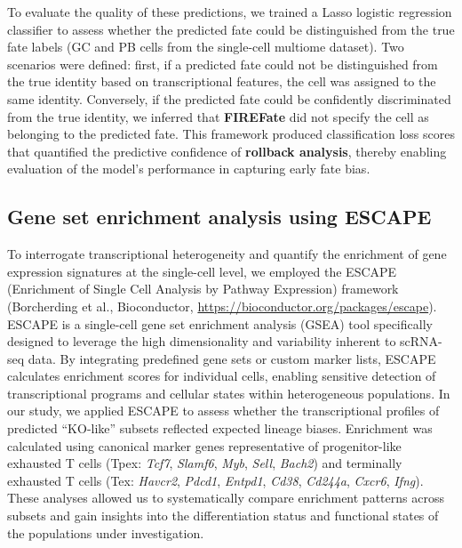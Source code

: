 \documentclass[11pt]{article}
\begin{document}
To evaluate the quality of these predictions, we trained a Lasso logistic regression
classifier to assess whether the predicted fate could be distinguished from the true fate
labels (GC and PB cells from the single-cell multiome dataset). Two scenarios were
defined: first, if a predicted fate could not be distinguished from the true identity
based on transcriptional features, the cell was assigned to the same identity.
Conversely, if the predicted fate could be confidently discriminated from the true
identity, we inferred that \textbf{FIREFate} did not specify the cell as belonging to the
predicted fate. This framework produced classification loss scores that quantified the
predictive confidence of \textbf{rollback analysis}, thereby enabling evaluation of the
model's performance in capturing early fate bias.

\subsection*{Gene set enrichment analysis using ESCAPE}

To interrogate transcriptional heterogeneity and quantify the enrichment of gene
expression signatures at the single-cell level, we employed the ESCAPE (Enrichment of
Single Cell Analysis by Pathway Expression) framework (Borcherding et al., Bioconductor,
\url{https://bioconductor.org/packages/escape}). ESCAPE is a single-cell gene set
enrichment analysis (GSEA) tool specifically designed to leverage the high dimensionality
and variability inherent to scRNA-seq data. By integrating predefined gene sets or custom
marker lists, ESCAPE calculates enrichment scores for individual cells, enabling
sensitive detection of transcriptional programs and cellular states within heterogeneous
populations. In our study, we applied ESCAPE to assess whether the transcriptional
profiles of predicted ``KO-like'' subsets reflected expected lineage biases. Enrichment
was calculated using canonical marker genes representative of progenitor-like exhausted
T cells (Tpex: \textit{Tcf7}, \textit{Slamf6}, \textit{Myb}, \textit{Sell},
\textit{Bach2}) and terminally exhausted T cells (Tex: \textit{Havcr2}, \textit{Pdcd1},
\textit{Entpd1}, \textit{Cd38}, \textit{Cd244a}, \textit{Cxcr6}, \textit{Ifng}). These
analyses allowed us to systematically compare enrichment patterns across subsets and gain
insights into the differentiation status and functional states of the populations under
investigation.
\end{document}
